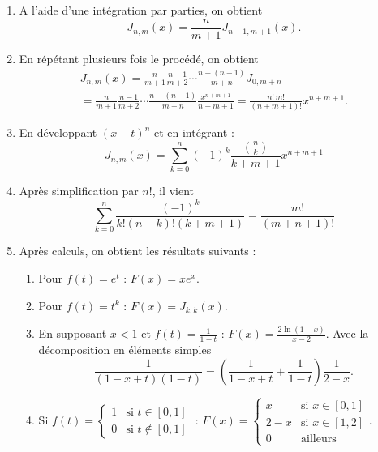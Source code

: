 \begin{enumerate}
\item  A l'aide d'une int{\'e}gration par parties, on obtient
\[
J_{n,m}(x)=\frac{n}{m+1}J_{n-1,m+1}(x).
\]

\item  En r{\'e}p{\'e}tant plusieurs fois le proc{\'e}d{\'e}, on obtient
\begin{multline*}
J_{n,m}(x) 
 = \frac{n}{m+1}\frac{n-1}{m+2}\cdots \frac{n-(n-1)}{m+n}J_{0,m+n}\\
 = \frac{n}{m+1}\frac{n-1}{m+2} \cdots \frac{n-(n-1)}{m+n}\frac{x^{n+m+1}}{n+m+1}
 = \frac{n!\,m!}{(n+m+1)!}x^{n+m+1}.
\end{multline*}

\item  En d{\'e}veloppant $(x-t)^{n}$ et en int{\'e}grant :
\[
J_{n,m}(x)=\sum_{k=0}^{n}(-1)^{k}\frac{\binom{n}{k}}{k+m+1}x^{n+m+1}
\]

\item  Apr{\`e}s simplification par $n!$, il vient
\[
\sum_{k=0}^{n}\frac{(-1)^{k}}{k!(n-k)!(k+m+1)}=\frac{m!}{(m+n+1)!}
\]

\item  Apr{\`e}s calculs, on obtient les r{\'e}sultats suivants :

\begin{enumerate}
\item  Pour $f(t)=e^{t}$ : $F(x)=xe^{x}$.

\item  Pour $f(t)=t^{k}$ : $F(x)=J_{k,k}(x).$

\item  En supposant $x < 1$ et $f(t) = \frac{1}{1-t}$ : $F(x) = \frac{2\ln (1-x)}{x-2}$.\newline
Avec la décomposition en éléments simples
\[
 \frac{1}{(1-x+t)(1-t)} = \left( \frac{1}{1-x+t} + \frac{1}{1-t}\right)\frac{1}{2-x}. 
\]


\item  Si $f(t)=\left\{
\begin{array}{ll}
1 & \text{si }t\in \left[ 0,1\right]  \\
0 & \text{si }t\notin \left[ 0,1\right]
\end{array}
\right. $ : $F(x)=\left\{
\begin{array}{ll}
x & \text{si }x\in \left[ 0,1\right]  \\
2-x & \text{si }x\in \left[ 1,2\right]  \\
0 & \text{ailleurs}
\end{array}
\right. $.
\end{enumerate}
\end{enumerate}
